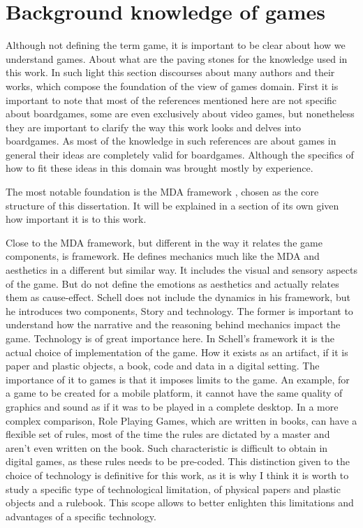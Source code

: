 \section{Background knowledge of games}

Although not defining the term game, it is important to be clear about how we understand games. About what are the paving stones for the knowledge used in this work. In such light this section discourses about many authors and their works, which compose the foundation of the view of games domain. First it is important to note that most of the references mentioned here are not specific about boardgames, some are even exclusively about video games, but nonetheless they are important to clarify the way this work looks and delves into boardgames. As most of the knowledge in such references are about games in general their ideas are completely valid for boardgames. Although the specifics of how to fit these ideas in this domain was brought mostly by experience.

The most notable foundation is the MDA framework \cite{Hunicke2004}, chosen as the core structure of this dissertation. It will be explained in a section of its own given how important it is to this work.

Close to the MDA framework, but different in the way it relates the game components, is \cite{schell2014art} framework. He defines mechanics much like the MDA and aesthetics in a different but similar way. It includes the visual and sensory aspects of the game. But do not define the emotions as aesthetics and actually relates them as cause-effect. Schell does not include the dynamics in his framework, but he introduces two components, Story and technology. The former is important to understand how the narrative and the reasoning behind mechanics impact the game. Technology is of great importance here. In Schell's framework it is the actual choice of implementation of the game. How it exists as an artifact, if it is paper and plastic objects, a book, code and data in a digital setting. The importance of it to games is that it imposes limits to the game. An example, for a game to be created for a mobile platform, it cannot have the same quality of graphics and sound as if it was to be played in a complete desktop. In a more complex comparison, Role Playing Games, which are written in books, can have a flexible set of rules, most of the time the rules are dictated by a master and aren't even written on the book. Such characteristic is difficult to obtain in digital games, as these rules needs to be pre-coded. This distinction given to the choice of technology is definitive for this work, as it is why I think it is worth to study a specific type of technological limitation, of physical papers and plastic objects and a rulebook. This scope allows to better enlighten this limitations and advantages of a specific technology.

